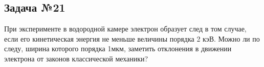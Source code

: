 \subsection{Задача №21}

При эксперименте в водородной камере электрон образует след в том случае, если его кинетическая энергия не меньше величины порядка 2 кэВ. Можно ли по следу, ширина которого порядка 1мкм, заметить отклонения в движении электрона от законов классической механики?